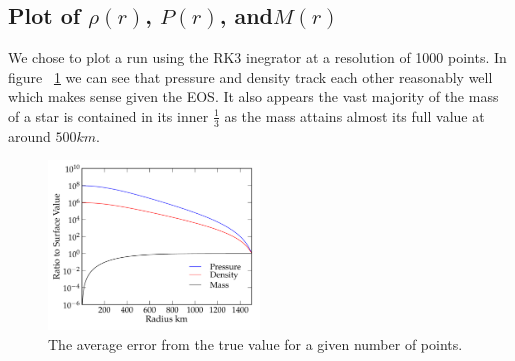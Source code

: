 \documentclass[11pt,letterpaper]{article}
\begin{document}
\subsection{Plot of $\rho(r)$, $P(r)$, and$M(r)$}

We chose to plot a run using the RK3 inegrator at a resolution of 1000 points. 
In figure ~\ref{fig:pPM} we can see that pressure and density track each other 
reasonably well which makes sense given the EOS. It also appears the vast
majority of the mass of a star is contained in its inner $\frac13$ as the mass
attains almost its full value at around $500km$. 

\begin{figure}[bth]
\centering
\includegraphics[width=0.5\textwidth]{4.pdf}
\caption{The average error from the true value for a given number of points.}
\label{fig:pPM}
\end{figure}
\end{document}
